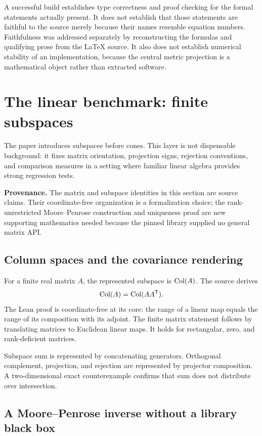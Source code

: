 \documentclass[11pt,a4paper]{article}
\begin{document}
A successful build establishes type correctness and proof checking for the
formal statements actually present. It does not establish that those
statements are faithful to the source merely because their names resemble
equation numbers. Faithfulness was addressed separately by reconstructing
the formulas and qualifying prose from the LaTeX source. It also does not
establish numerical stability of an implementation, because the central
metric projection is a mathematical object rather than extracted software.

\section{The linear benchmark: finite subspaces}
\label{sec:subspaces}

The paper introduces subspaces before cones. This layer is not dispensable
background: it fixes matrix orientation, projection signs, rejection
conventions, and comparison measures in a setting where familiar linear
algebra provides strong regression tests.

\textbf{Provenance.} The matrix and subspace identities in this section are
source claims. Their coordinate-free organization is a formalization choice;
the rank-unrestricted Moore--Penrose construction and uniqueness proof are new
supporting mathematics needed because the pinned library supplied no general
matrix API.

\subsection{Column spaces and the covariance rendering}

For a finite real matrix \(A\), the represented subspace is
\(\operatorname{Col}(A)\). The source derives
\[
  \operatorname{Col}(A)=\operatorname{Col}(AA^\mathsf{T}).
\]
The Lean proof is coordinate-free at its core: the range of a linear map
equals the range of its composition with its adjoint. The finite matrix
statement follows by translating matrices to Euclidean linear maps. It holds
for rectangular, zero, and rank-deficient matrices.

Subspace sum is represented by concatenating generators. Orthogonal
complement, projection, and rejection are represented by projector
composition. A two-dimensional exact counterexample confirms that sum does
not distribute over intersection.

\subsection{A Moore--Penrose inverse without a library black box}
\end{document}
